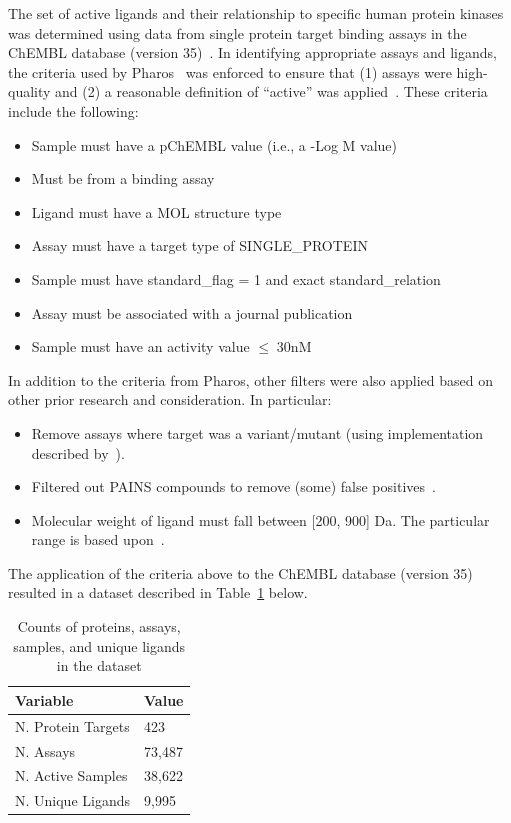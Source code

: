 \documentclass[11pt]{article}
\begin{document}
The set of active ligands and their relationship to specific human protein kinases was determined using data from single protein target binding assays in the ChEMBL database (version 35)~\cite{chembl_db_2023}. 
In identifying appropriate assays and ligands, the criteria used by Pharos~\cite{pharos_2022} was enforced to ensure that (1) assays were high-quality and (2) a reasonable definition of ``active'' was applied~\cite{pharos_2022}. 
These criteria include the following:
\begin{itemize}
    \item Sample must have a pChEMBL value (i.e., a -Log M value)
    \item Must be from a binding assay
    \item Ligand must have a MOL structure type
    \item Assay must have a target type of SINGLE\_PROTEIN
    \item Sample must have standard\_flag = 1 and exact standard\_relation
    \item Assay must be associated with a journal publication
    \item Sample must have an activity value $\leq \; 30 \text{nM}$
\end{itemize}

In addition to the criteria from Pharos, other filters were also applied based on other prior research and consideration. In particular:
\begin{itemize}
    \item Remove assays where target was a variant/mutant (using implementation described by~\cite{landrum_riniker_2024}).
    \item Filtered out PAINS compounds to remove (some) false positives~\cite{baell_holloway_2010}.
    \item Molecular weight of ligand must fall between [200, 900] Da. The particular range is based upon~\cite{filip_miljkovic_jurgen_bajorath_2018}. 
\end{itemize}

The application of the criteria above to the ChEMBL database (version 35) resulted in a dataset described in Table~\ref{tab:1} below.

\begin{table}[!ht]
\centering
\begin{tabular}{|l|l|}
    \hline
    \textbf{Variable} & \textbf{Value} \\ \hline
    N. Protein Targets & 423 \\ \hline
    N. Assays & 73,487 \\ \hline
    N. Active Samples & 38,622 \\ \hline
    N. Unique Ligands & 9,995 \\ \hline
\end{tabular}
\caption{Counts of proteins, assays, samples, and unique ligands in the dataset}\label{tab:1}
\end{table}
\end{document}
